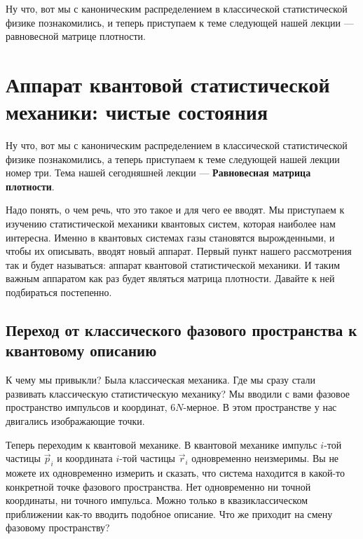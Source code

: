 \documentclass[../general/general]{subfiles}
\begin{document}
Ну что, вот мы с каноническим распределением в классической статистической физике познакомились, и теперь приступаем к теме следующей нашей лекции — равновесной матрице плотности.

\section{Аппарат квантовой статистической механики: чистые состояния}

Ну что, вот мы с каноническим распределением в классической статистической физике познакомились, а теперь приступаем к теме следующей нашей лекции номер три. Тема нашей сегодняшней лекции — \textbf{Равновесная матрица плотности}. 

Надо понять, о чем речь, что это такое и для чего ее вводят. Мы приступаем к изучению статистической механики квантовых систем, которая наиболее нам интересна. Именно в квантовых системах газы становятся вырожденными, и чтобы их описывать, вводят новый аппарат. Первый пункт нашего рассмотрения так и будет называться: аппарат квантовой статистической механики. И таким важным аппаратом как раз будет являться матрица плотности. Давайте к ней подбираться постепенно.

\subsection{Переход от классического фазового пространства к квантовому описанию}

К чему мы привыкли? Была классическая механика. Где мы сразу стали развивать классическую статистическую механику? Мы вводили с вами фазовое пространство импульсов и координат, $6N$-мерное. В этом пространстве у нас двигались изображающие точки.

Теперь переходим к квантовой механике. В квантовой механике импульс $i$-той частицы $\vec{p}_i$ и координата $i$-той частицы $\vec{r}_i$ одновременно неизмеримы. Вы не можете их одновременно измерить и сказать, что система находится в какой-то конкретной точке фазового пространства. Нет одновременно ни точной координаты, ни точного импульса. Можно только в квазиклассическом приближении как-то вводить подобное описание. Что же приходит на смену фазовому пространству? 
\end{document}
